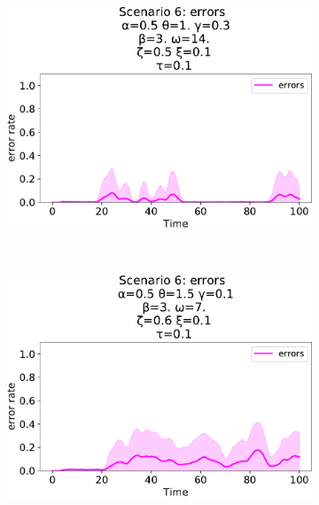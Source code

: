\begin{figure}[!ht]
\begin{subfigure}[b]{0.32\textwidth}
    \includegraphics[width=\textwidth]{papers/swarm-intelligence2021/img/simulations/movement-errors_0_08_α-0.5_θ-1._γ-0.3_β-3._ω-14._ζ-0.5.pdf}
  \end{subfigure}
  \\
  \begin{subfigure}[b]{0.32\textwidth}
    \centering
    \includegraphics[width=\textwidth]{papers/swarm-intelligence2021/img/simulations/movement-errors_0_08_α-0.5_θ-1.5_γ-0.1_β-3._ω-7._ζ-0.6.pdf}
  \end{subfigure}
  \hfill
  \begin{subfigure}[b]{0.32\textwidth}
    \centering

\end{subfigure}
\end{figure}
